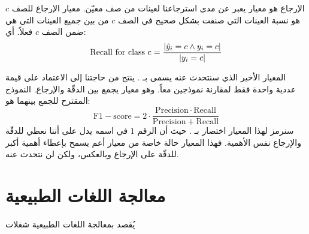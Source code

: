 الإرجاع  هو معيار يعبر عن مدى استرجاعنا لعينات من صف معيّن.
معيار الإرجاع للصف $c$ هو نسبة العينات التي صنفت بشكل صحيح في الصف $c$ من بين جميع العينات التي هي ضمن الصف $c$ فعلاً.
أي:
$$ \mathrm{Recall\ for\ class\ c} =
\frac{ \left\vert \hat{y}_i = c \wedge y_i = c \right\vert }{ \left\vert y_i = c \right\vert } $$

المعيار الأخير الذي سنتحدث عنه يسمى بـ .
ينتج من حاجتنا إلى الاعتماد على قيمة عددية واحدة فقط لمقارنة نموذجين معاً.
وهو معيار يجمع بين الدقّة والإرجاع.
النموذج المقترح للجمع بينهما هو:
$$ \mathrm{F1-score} = 2 \cdot \frac{ \mathrm{Precision} \cdot \mathrm{Recall}}
{\mathrm{Precision} + \mathrm{Recall}} $$
سنرمز لهذا المعيار اختصار بـ .
حيث أن الرقم $1$ في اسمه يدل على أننا نعطي للدقّة والإرجاع نفس الأهمية.
فهذا المعيار حالة خاصة من معيار أعم يسمح بإعطاء أهمية أكبر للدقّة على الإرجاع وبالعكس، ولكن لن نتحدث عنه.



\section{معالجة اللغات الطبيعية}
يُقصد بمعالجة اللغات الطبيعية
شغلات

 